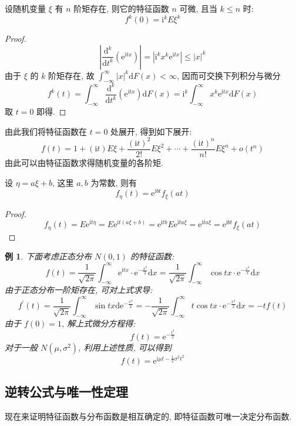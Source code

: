 \documentclass[12pt,a4paper]{article}
\newtheorem{example}{例}[subsection] %
\begin{document}
设随机变量 $\xi$ 有 $n$ 阶矩存在, 则它的特征函数 $n$ 可微, 且当 $k \leq n$ 时:
\[f^{k}(0) = \mathrm{i}^{k} E \xi^k\]

\begin{proof}
    \[|\frac{\mathrm{d}^k}{\mathrm{d}t^k} (\mathrm{e}^{\mathrm{i}tx})| = | \mathrm{i}^k x^k \mathrm{e}^{\mathrm{i}tx} | \leq |x|^k\]
    由于 $\xi$ 的 $k$ 阶矩存在, 故 $\int_{-\infty}^{\infty} |x|^k \mathrm{d}F(x) < \infty$, 因而可交换下列积分与微分
    \[f^k(t) = \int_{-\infty}^{\infty} \frac{\mathrm{d}^k}{\mathrm{d}t^k} (\mathrm{e}^{\mathrm{i}tx}) \mathrm{d}F(x) = \mathrm{i}^k \int_{-\infty}^{\infty} x^k \mathrm{e}^{\mathrm{i}tx} \mathrm{d} F(x)\]
    取 $t = 0$ 即得.
\end{proof}

由此我们将特征函数在 $t = 0$ 处展开, 得到如下展开:
\[f(t) = 1 + (\mathrm{i} t) E \xi + \frac{(\mathrm{i}t)^2}{2!} E \xi^2 + \cdots + \frac{(\mathrm{i}t)^n}{n!} E \xi^n + o(t^n)\]
由此可以由特征函数求得随机变量的各阶矩.

设 $\eta = a \xi + b$, 这里 $a, b$ 为常数, 则有 \[f_{\eta}(t) = \mathrm{e}^{\mathrm{i}bt} f_{\xi}(at)\]
\begin{proof}
    \[f_{\eta}(t) = E \mathrm{e}^{\mathrm{i}t \eta} = E \mathrm{e}^{\mathrm{i}t(a\xi + b)} = \mathrm{e}^{\mathrm{i}tb} E \mathrm{e}^{\mathrm{i}ta\xi} = \mathrm{e}^{\mathrm{i}ta\xi} = \mathrm{e}^{\mathrm{i}bt}f_{\xi}(at)\]
\end{proof}

\begin{example}
    下面考虑正态分布 $N(0, 1)$ 的特征函数:
    \[f(t) = \frac{1}{\sqrt{2\pi}} \int_{-\infty}^{\infty} \mathrm{e}^{\mathrm{i}tx} \cdot \mathrm{e}^{-\frac{x^2}{2}} \mathrm{d}x = \frac{1}{\sqrt{2\pi}} \int_{-\infty}^{\infty} \cos tx \cdot \mathrm{e}^{-\frac{x^2}{x}} \mathrm{d}x\] 
    由于正态分布一阶矩存在, 可对上式求导:
    \[f^{\prime}(t) = \frac{1}{\sqrt{2\pi}} \int_{-\infty}^{\infty} \sin tx \mathrm{d} \mathrm{e}^{-\frac{x^2}{2}} 
    = -\frac{1}{\sqrt{2\pi}} \int_{-\infty}^{\infty} t \cos tx \cdot \mathrm{e}^{-\frac{x^2}{2}} \mathrm{d}x = -tf(t)\]
    由于 $f(0) = 1$, 解上式微分方程得: 
    \[f(t) = \mathrm{e}^{-\frac{t^2}{2}}\]
    对于一般 $N(\mu, \sigma^2)$, 利用上述性质, 可以得到\[f(t) = \mathrm{e}^{\mathrm{i}\mu t - \frac{1}{2}\sigma^2 t^2}\]
\end{example}

\subsection{逆转公式与唯一性定理}
现在来证明特征函数与分布函数是相互确定的, 即特征函数可唯一决定分布函数.
\end{document}
